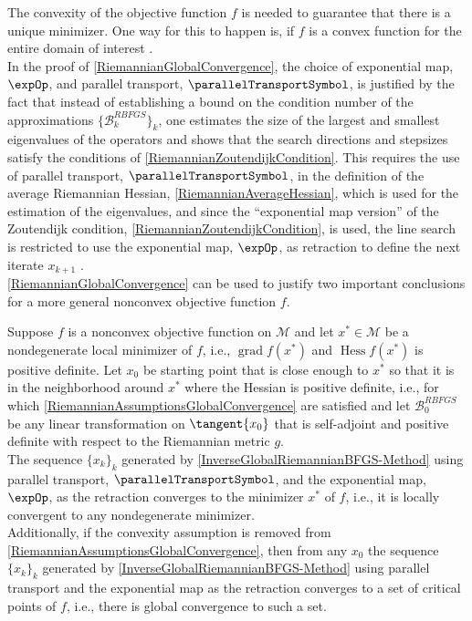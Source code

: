 The convexity of the objective function $f$ is needed to guarantee that there is a unique minimizer. One way for this to happen is, if $f$ is a convex function for the entire domain of interest \cite[p.~28]{Qi:2011}. \\
In the proof of \cref{RiemannianGlobalConvergence}, the choice of exponential map, $\expOp$, and parallel transport, $\parallelTransportSymbol$, is justified by the fact that instead of establishing a bound on the condition number of the approximations $\{ \mathcal{B}^{RBFGS}_{k} \}_k$, one estimates the size of the largest and smallest eigenvalues of the operators and shows that the search directions and stepsizes satisfy the conditions of \cref{RiemannianZoutendijkCondition}. This requires the use of parallel transport, $\parallelTransportSymbol$, in the definition of the average Riemannian Hessian, \cref{RiemannianAverageHessian}, which is used for the estimation of the eigenvalues, and since the “exponential map version” of the Zoutendijk condition, \cref{RiemannianZoutendijkCondition}, is used, the line search is restricted to use the exponential map, $\expOp$, as retraction to define the next iterate $x_{k+1}$ \cite[p.~25]{Qi:2011}. \\
\cref{RiemannianGlobalConvergence} can be used to justify two important conclusions for a more general nonconvex objective function $f$.

\begin{corollary}[{\cite[Corollary~2.4.1.]{Qi:2011}}] 
    Suppose $f$ is a nonconvex objective function on $\mathcal{M}$ and let $x^{*} \in \mathcal{M}$ be a nondegenerate local minimizer of $f$, i.e., $\operatorname{grad} f(x^{*})$ and $\operatorname{Hess} f(x^{*})$ is positive definite. Let $x_0$ be starting point that is close enough to $x^{*}$ so that it is in the neighborhood around $x^{*}$ where the Hessian is positive definite, i.e., for which \cref{RiemannianAssumptionsGlobalConvergence} are satisfied and let $\mathcal{B}^{RBFGS}_{0}$ be any linear transformation on $\tangent{x_0}$ that is self-adjoint and positive definite with respect to the Riemannian metric $g$. \\
    The sequence $\{ x_k \}_k$ generated by \cref{InverseGlobalRiemannianBFGS-Method} using parallel transport, $\parallelTransportSymbol$, and the exponential map, $\expOp$, as the retraction converges to the minimizer $x^{*}$ of $f$, i.e., it is locally convergent to any nondegenerate minimizer. \\
    Additionally, if the convexity assumption is removed from \cref{RiemannianAssumptionsGlobalConvergence}, then from any $x_0$ the sequence $\{ x_k \}_k$ generated by \cref{InverseGlobalRiemannianBFGS-Method} using parallel transport and the exponential map as the retraction converges to a set of critical points of $f$, i.e., there is global convergence to such a set.
\end{corollary}


